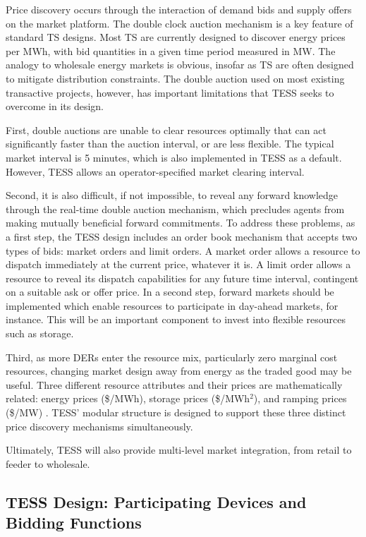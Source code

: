 \documentclass[12pt]{article}{Definitions/mdpi}
\begin{document}
Price discovery occurs through the interaction of demand bids and supply offers on the market platform. 
The double clock auction mechanism is a key feature of standard TS designs. Most TS are currently designed to discover energy prices per MWh, with bid quantities in a given time period measured in MW.  The analogy to wholesale energy markets is obvious, insofar as TS are often designed to mitigate distribution constraints.
The double auction used on most existing transactive projects, however, has important limitations that TESS seeks to overcome in its design. 

First, double auctions are unable to clear resources optimally that can act significantly faster than the auction interval, or are less flexible. The typical market interval is 5 minutes, which is also implemented in TESS as a default. However, TESS allows an operator-specified market clearing interval.

Second, it is also difficult, if not impossible, to reveal any forward knowledge through the real-time double auction  mechanism, which precludes agents from making mutually beneficial forward commitments. To address these problems, as a first step, the TESS design includes an order book mechanism that accepts two types of bids: market orders and limit orders. A market order allows a resource to dispatch immediately at the current price, whatever it is. A limit order allows a resource to reveal its dispatch capabilities for any future time interval, contingent on a suitable ask or offer price. 
In a second step, forward markets should be implemented which enable resources to participate in day-ahead markets, for instance. This will be an important component to invest into flexible resources such as storage.

Third, as more DERs enter the resource mix, particularly zero marginal cost resources, changing market design away from energy as the traded good may be useful. Three different resource attributes and their prices are mathematically related: energy prices (\$/MWh), storage prices (\$/MWh$^2$), and ramping prices (\$/MW) \citep{chassin2017thesis}. TESS' modular structure is designed to support these three distinct price discovery mechanisms simultaneously. 

Ultimately, TESS will also provide multi-level market integration, from retail to feeder to wholesale.

\subsection{TESS Design: Participating Devices and Bidding Functions}\label{sec:devices}
\end{document}

